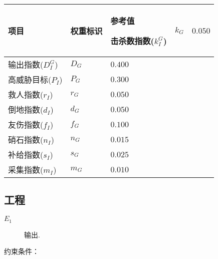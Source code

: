 \documentclass{ctexart}
\begin{document}
\begin{longtable}{|>{\centering\arraybackslash}p{8em}|>{\centering\arraybackslash}p{4em}|>{\centering\arraybackslash}p{6em}|}
    \hline

    项目             & 权重标识  & 参考值     \endhead

    \hline

    击杀数指数($k_I^G$) & $k_G$ & $0.050$          \\

    \hline

    输出指数($D_I^G$)  & $D_G$ & $0.400$          \\

    \hline

    高威胁目标($P_I$)   & $P_G$ & $0.300$          \\

    \hline

    救人指数($r_I$)    & $r_G$ & $0.050$          \\

    \hline

    倒地指数($d_I$)    & $d_G$ & $0.050$          \\

    \hline

    友伤指数($f_I$)    & $f_G$ & $0.100$          \\

    \hline

    硝石指数($n_I$)    & $n_G$ & $0.015$          \\

    \hline

    补给指数($s_I$)    & $s_G$ & $0.025$          \\

    \hline

    采集指数($m_I$)    & $m_G$ & $0.010$          \\

    \hline
\end{longtable}


\subsection{工程}

\begin{description}
    \item[$E_1$] 输出\cite{tieba-all}\cite{xiaoheihe-all}.
\end{description}

约束条件：
\end{document}
